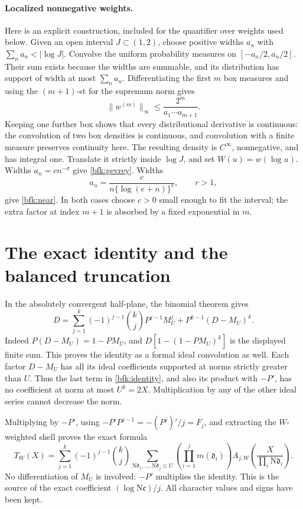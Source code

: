 \paragraph{Localized nonnegative weights.}
Here is an explicit construction, included for the quantifier
over weights used below.  Given an open interval \(J\subset(1,2)\),
choose positive widths \(a_n\) with
\(\sum_n a_n<|\log J|\).  Convolve the uniform probability
measures on \([-a_n/2,a_n/2]\).  Their sum exists because the
widths are summable, and its distribution has support of width
at most \(\sum_n a_n\).
Differentiating the first \(m\) box measures and using the
\((m+1)\)-st for the supremum norm gives
\[
 \|w^{(m)}\|_\infty
 \le \frac{2^m}{a_1\cdots a_{m+1}}.
\]
Keeping one further box shows that every distributional
derivative is continuous: the convolution of two box densities
is continuous, and convolution with a finite measure preserves
continuity here.  The resulting density is \(C^\infty\),
nonnegative, and has integral one.
Translate it strictly inside \(\log J\), and set \(W(u)=w(\log u)\).
Widths \(a_n=c n^{-\sigma}\) give \eqref{bfk:gevrey}.
Widths
\[
 a_n=\frac{c}{n\{\log(e+n)\}^{r}},\qquad r>1,
\]
give \eqref{bfk:near}.  In both cases choose \(c>0\) small enough
to fit the interval; the extra factor at index \(m+1\) is absorbed
by a fixed exponential in \(m\).

\section{The exact identity and the balanced truncation}

In the absolutely convergent half-plane, the binomial theorem
gives
\begin{equation}
 D=\sum_{j=1}^{k}(-1)^{j-1}\binom{k}{j}P^{j-1}M_U^j
          +P^{k-1}(D-M_U)^k.
 \label{bfk:identity}
\end{equation}
Indeed \(P(D-M_U)=1-PM_U\), and
\(D[1-(1-PM_U)^k]\) is the displayed finite sum.
This proves the identity as a formal ideal convolution as well.
Each factor \(D-M_U\) has all its ideal coefficients supported
at norms strictly greater than \(U\).  Thus the last term in
\eqref{bfk:identity}, and also its product with \(-P'\), has
no coefficient at norm at most \(U^k=2X\).
Multiplication by any of the other ideal series cannot decrease
the norm.

Multiplying by \(-P'\), using
\(-P'P^{j-1}=-(P^j)'/j=F_j\), and extracting the \(W\)-weighted
shell proves the exact formula
\begin{equation}
 T_W(X)=\sum_{j=1}^k(-1)^{j-1}\binom{k}{j}
  \sum_{\mathrm N\mathfrak d_1,\ldots,\mathrm N\mathfrak d_j\le U}
   \left(\prod_{i=1}^j m(\mathfrak d_i)\right)
   A_{j,W}\left(\frac X{\prod_i\mathrm N\mathfrak d_i}\right).
 \label{bfk:exact}
\end{equation}
No differentiation of \(M_U\) is involved: \(-P'\) multiplies
the identity.  This is the source of the exact coefficient
\((\log\mathrm N\mathfrak c)/j\).
All character values and signs have been kept.

